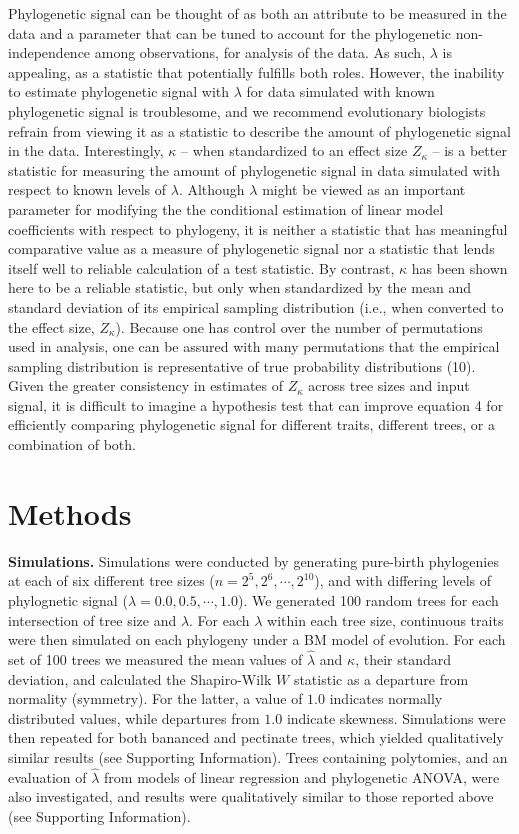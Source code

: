 \documentclass[9pt,twocolumn,twoside,lineno]{pnas-new}
\begin{document}
Phylogenetic signal can be thought of as both an attribute to be
measured in the data and a parameter that can be tuned to account for
the phylogenetic non-independence among observations, for analysis of
the data. As such, \(\lambda\) is appealing, as a statistic that
potentially fulfills both roles. However, the inability to estimate
phylogenetic signal with \(\lambda\) for data simulated with known
phylogenetic signal is troublesome, and we recommend evolutionary
biologists refrain from viewing it as a statistic to describe the amount
of phylogenetic signal in the data. Interestingly, \(\kappa\) -- when
standardized to an effect size \(Z_\kappa\) -- is a better statistic for
measuring the amount of phylogenetic signal in data simulated with
respect to known levels of \(\lambda\). Although \(\lambda\) might be
viewed as an important parameter for modifying the the conditional
estimation of linear model coefficients with respect to phylogeny, it is
neither a statistic that has meaningful comparative value as a measure
of phylogenetic signal nor a statistic that lends itself well to
reliable calculation of a test statistic. By contrast, \(\kappa\) has
been shown here to be a reliable statistic, but only when standardized
by the mean and standard deviation of its empirical sampling
distribution (i.e., when converted to the effect size, \(Z_\kappa\)).
Because one has control over the number of permutations used in
analysis, one can be assured with many permutations that the empirical
sampling distribution is representative of true probability
distributions (10). Given the greater consistency in estimates of
\(Z_\kappa\) across tree sizes and input signal, it is difficult to
imagine a hypothesis test that can improve equation 4 for efficiently
comparing phylogenetic signal for different traits, different trees, or
a combination of both.

\hypertarget{methods}{%
\section{Methods}\label{methods}}

\textbf{Simulations.} Simulations were conducted by generating
pure-birth phylogenies at each of six different tree sizes
(\(n=2^5, 2^6, \cdots, 2^{10}\)), and with differing levels of
phylognetic signal (\(\lambda=0.0, 0.5, \cdots, 1.0\)). We generated 100
random trees for each intersection of tree size and \(\lambda\). For
each \(\lambda\) within each tree size, continuous traits were then
simulated on each phylogeny under a BM model of evolution. For each set
of 100 trees we measured the mean values of \(\hat{\lambda}\) and
\(\kappa\), their standard deviation, and calculated the Shapiro-Wilk
\(W\) statistic as a departure from normality (symmetry). For the
latter, a value of \(1.0\) indicates normally distributed values, while
departures from \(1.0\) indicate skewness. Simulations were then
repeated for both bananced and pectinate trees, which yielded
qualitatively similar results (see Supporting Information). Trees
containing polytomies, and an evaluation of \(\hat{\lambda}\) from
models of linear regression and phylogenetic ANOVA, were also
investigated, and results were qualitatively similar to those reported
above (see Supporting Information).
\end{document}
